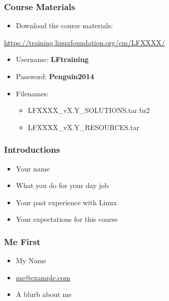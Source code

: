 \documentclass[bigger]{beamer}
\makeatletter
\newcommand{\mycourse}{LFXXXX}
\newcommand{\myversion}{vX.Y}
\newcommand{\myname}{My Name}
\newcommand{\myemail}{me@example.com}
\newcommand{\myblurb}{A blurb about me}
\newif\ifVIRTUAL
\makeatother
\begin{document}
\begin{frame}
	\frametitle{Course Materials}
	\LARGE
	\begin{itemize} 
		\item Download the course materials:
	\end{itemize} 
	\vspace{-0.5em}
	{\normalsize\url{https://training.linuxfoundation.org/cm/\mycourse/}}
	\vspace{0.5em}
	\begin{itemize} 
		\item Username: \textbf{LFtraining}
		\item Password: \textbf{Penguin2014}
		\vspace{0.5em}
		\item Filenames:
		\begin{itemize} 
			\Large
			\item \mycourse\_\myversion\_SOLUTIONS.tar.bz2
			\item \mycourse\_\myversion\_RESOURCES.tar
		\end{itemize} 
	\end{itemize}
\end{frame}

\begin{frame}
	\frametitle{Introductions}
	\LARGE
	\begin{itemize} 
		\item Your name
		\item What you do for your day job
		\item Your past experience with Linux
		\item Your expectations for this course
		\ifVIRTUAL
			\item Your Linux Distribution
			\item (Your Time Zone)
		\fi %
	\end{itemize} 
\end{frame}

\begin{frame}
	\frametitle{Me First}
	\LARGE
	\begin{itemize} 
		\item \myname
		\item \url{\myemail}
		\item \myblurb
	\end{itemize} 
\end{frame}
\end{document}
